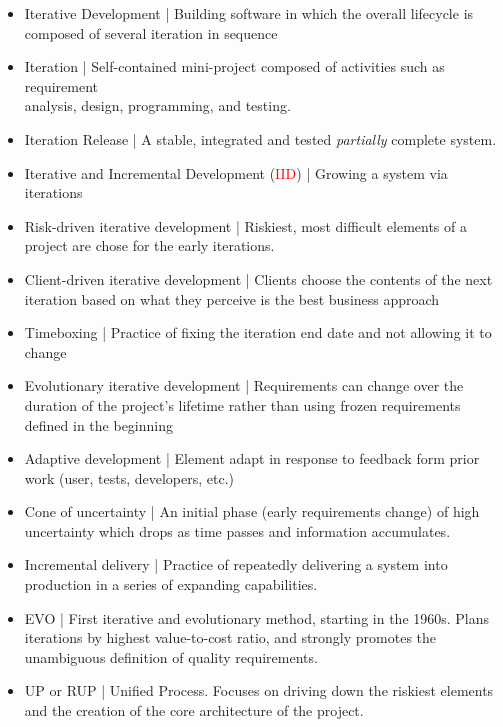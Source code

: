 \documentclass{article}
\begin{document}
\begin{itemize}

\item Iterative Development | Building software in which the overall lifecycle is composed of several iteration in sequence
\item Iteration | Self-contained mini-project composed of activities such as requirement \\ analysis, design, programming, and testing.
\item Iteration Release | A stable, integrated and tested \emph{partially} complete system.
\item Iterative and Incremental Development (\textcolor{red}{IID}) | Growing a system via iterations
\item Risk-driven iterative development | Riskiest, most difficult elements of a project are chose for the early iterations.
\item Client-driven iterative development | Clients choose the contents of the next iteration based on what they perceive is the best business approach
\item Timeboxing | Practice of fixing the iteration end date and not allowing it to change
\item Evolutionary iterative development | Requirements can change over the duration of the project's lifetime rather than using frozen requirements defined in the beginning
\item Adaptive development | Element adapt in response to feedback form prior work (user, tests, developers, etc.)
\item Cone of uncertainty |  An initial phase (early requirements change) of high uncertainty which drops as time passes and information accumulates.
\item Incremental delivery | Practice of repeatedly delivering a system into production in a series of expanding capabilities.
\item EVO | First iterative and evolutionary method, starting in the 1960s. Plans iterations by highest value-to-cost ratio, and strongly promotes the unambiguous definition of quality requirements.
\item UP or RUP | Unified Process. Focuses on driving down the riskiest elements and the creation of the core architecture of the project.

\end{itemize}
\end{document}

